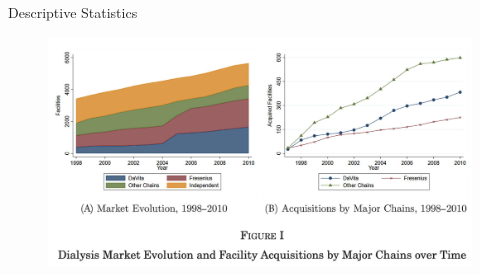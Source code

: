 \begin{frame}{Descriptive Statistics}
    \begin{figure}
        \centering
        \includegraphics[width=0.9\linewidth]{fig1.png}
    \end{figure}
\end{frame}